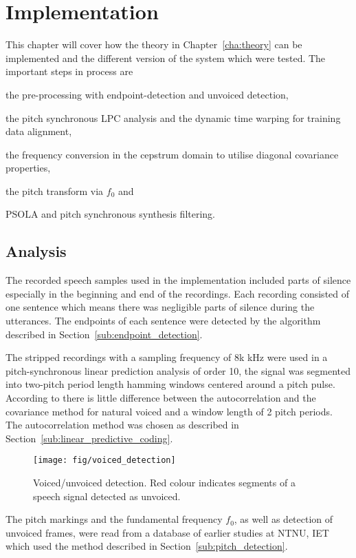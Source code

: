 \chapter{Implementation} %
\label{cha:implementation}
This chapter will cover how the theory in Chapter~\ref{cha:theory} can be implemented and the different version of the system which were tested. The important steps in process are \begin{inparaenum}  \item the pre-processing with endpoint-detection and unvoiced detection, \item the pitch synchronous LPC analysis and the dynamic time warping for training data alignment, \item the frequency conversion in the cepstrum domain to utilise diagonal covariance properties, \item the pitch transform via $f_0$ and \item PSOLA and pitch synchronous synthesis filtering. \end{inparaenum}

\section{Analysis} %
\label{sec:analysis}
The recorded speech samples used in the implementation included parts of silence especially in the beginning and end of the recordings. Each recording consisted of one sentence which means there was negligible parts of silence during the utterances. The endpoints of each sentence were detected by the algorithm described in Section~\ref{sub:endpoint_detection}.

The stripped recordings with a sampling frequency of 8k kHz were used in a pitch-synchronous linear prediction analysis of order 10, \ie the signal was segmented into two-pitch period length hamming windows centered around a pitch pulse. According to \cite{chandra74} there is little difference between the autocorrelation and the covariance method for natural voiced and a window length of 2 pitch periods. The autocorrelation method was chosen as described in Section~\ref{sub:linear_predictive_coding}. 
\begin{figure}[htbp]
	\begin{center}
		\texttt{[image: fig/voiced\_detection]}
		\caption{Voiced/unvoiced detection. Red colour indicates segments of a speech signal detected as unvoiced.}
		\label{fig:voiced_detection}
	\end{center}
\end{figure}
The pitch markings and the fundamental frequency $f_0$, as well as detection of unvoiced frames, were read from a database of earlier studies at NTNU, IET which used the method described in Section~\ref{sub:pitch_detection}. 

